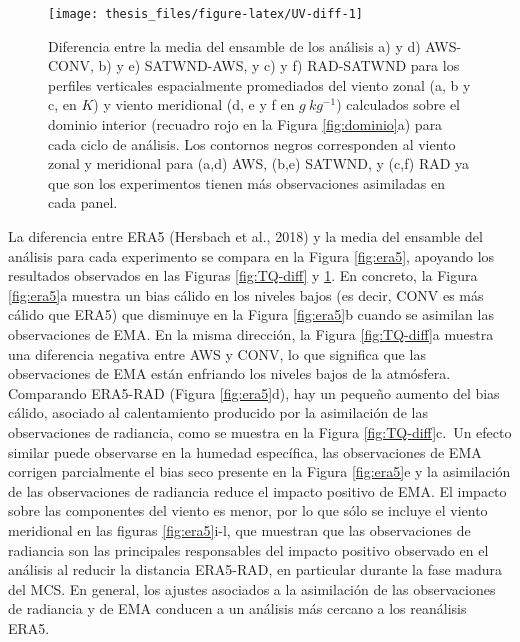 \documentclass[12pt,oneside]{reedthesis}
\begin{document}
\begin{figure}

{\centering \texttt{[image: thesis\_files/figure-latex/UV-diff-1]} 

}

\caption{Diferencia entre la media del ensamble de los análisis a) y d) AWS-CONV, b) y e) SATWND-AWS, y c) y f) RAD-SATWND para los perfiles verticales espacialmente promediados del viento zonal (a, b y c, en \(K\)) y viento meridional (d, e y f en \(g\ kg^{-1}\)) calculados sobre el dominio interior (recuadro rojo en la Figura \ref{fig:dominio}a) para cada ciclo de análisis. Los contornos negros corresponden al viento zonal y meridional para (a,d) AWS, (b,e) SATWND, y (c,f) RAD ya que son los experimentos tienen más observaciones asimiladas en cada panel.}\label{fig:UV-diff}
\end{figure}
La diferencia entre ERA5 (Hersbach et al., 2018) y la media del ensamble del análisis para cada experimento se compara en la Figura \ref{fig:era5}, apoyando los resultados observados en las Figuras \ref{fig:TQ-diff} y \ref{fig:UV-diff}. En concreto, la Figura \ref{fig:era5}a muestra un bias cálido en los niveles bajos (es decir, CONV es más cálido que ERA5) que disminuye en la Figura \ref{fig:era5}b cuando se asimilan las observaciones de EMA. En la misma dirección, la Figura \ref{fig:TQ-diff}a muestra una diferencia negativa entre AWS y CONV, lo que significa que las observaciones de EMA están enfriando los niveles bajos de la atmósfera. Comparando ERA5-RAD (Figura \ref{fig:era5}d), hay un pequeño aumento del bias cálido, asociado al calentamiento producido por la asimilación de las observaciones de radiancia, como se muestra en la Figura \ref{fig:TQ-diff}c.~Un efecto similar puede observarse en la humedad específica, las observaciones de EMA corrigen parcialmente el bias seco presente en la Figura \ref{fig:era5}e y la asimilación de las observaciones de radiancia reduce el impacto positivo de EMA. El impacto sobre las componentes del viento es menor, por lo que sólo se incluye el viento meridional en las figuras \ref{fig:era5}i-l, que muestran que las observaciones de radiancia son las principales responsables del impacto positivo observado en el análisis al reducir la distancia ERA5-RAD, en particular durante la fase madura del MCS. En general, los ajustes asociados a la asimilación de las observaciones de radiancia y de EMA conducen a un análisis más cercano a los reanálisis ERA5.
\end{document}
